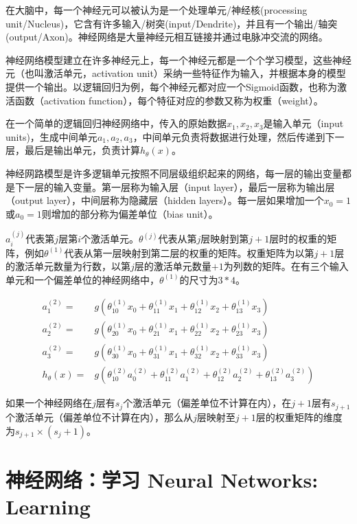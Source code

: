 \documentclass[12pt, a4paper]{article}
\begin{document}
在大脑中，每一个神经元可以被认为是一个处理单元/神经核(processing unit/Nucleus)，它含有许多输入/树突(input/Dendrite)，并且有一个输出/轴突(output/Axon)。神经网络是大量神经元相互链接并通过电脉冲交流的网络。

神经网络模型建立在许多神经元上，每一个神经元都是一个个学习模型，这些神经元（也叫激活单元，activation unit）采纳一些特征作为输入，并根据本身的模型提供一个输出。以逻辑回归为例，每个神经元都对应一个Sigmoid函数，也称为激活函数（activation function），每个特征对应的参数又称为权重（weight）。

在一个简单的逻辑回归神经网络中，传入的原始数据$x_1, x_2, x_3$是输入单元（input units)，生成中间单元$a_1, a_2, a_3$，中间单元负责将数据进行处理，然后传递到下一层，最后是输出单元，负责计算$h_\theta(x)$。

神经网路模型是许多逻辑单元按照不同层级组织起来的网络，每一层的输出变量都是下一层的输入变量。第一层称为输入层（input layer），最后一层称为输出层（output layer），中间层称为隐藏层（hidden layers）。每一层如果增加一个$x_0=1$或$a_0=1$则增加的部分称为偏差单位（bias unit）。

$a_i^{(j)}$代表第$j$层第$i$个激活单元。$\theta^{(j)}$代表从第$j$层映射到第$j+1$层时的权重的矩阵，例如$\theta^{(1)}$代表从第一层映射到第二层的权重的矩阵。权重矩阵为以第$j+1$层的激活单元数量为行数，以第$j$层的激活单元数量$+1$为列数的矩阵。在有三个输入单元和一个偏差单位的神经网络中，$\theta^{(1)}$的尺寸为$3*4$。

\begin{align*}
    a_1^{(2)} =   & g(\theta_{10}^{(1)}x_0+\theta_{11}^{(1)}x_1+\theta_{12}^{(1)}x_2+\theta_{13}^{(1)}x_3)                         \\
    a_2^{(2)} =   & g(\theta_{20}^{(1)}x_0+\theta_{21}^{(1)}x_1+\theta_{22}^{(1)}x_2+\theta_{23}^{(1)}x_3)                         \\
    a_3^{(2)} =   & g(\theta_{30}^{(1)}x_0+\theta_{31}^{(1)}x_1+\theta_{32}^{(1)}x_2+\theta_{33}^{(1)}x_3)                         \\
    h_\theta(x) = & g(\theta_{10}^{(2)}a_0^{(2)}+\theta_{11}^{(2)}a_1^{(2)}+\theta_{12}^{(2)}a_2^{(2)}+\theta_{13}^{(2)}a_3^{(2)})
\end{align*}

如果一个神经网络在$j$层有$s_j$个激活单元（偏差单位不计算在内），在$j+1$层有$s_{j+1}$个激活单元（偏差单位不计算在内），那么从$j$层映射至$j+1$层的权重矩阵的维度为$s_{j+1}\times(s_j+1)$。

\section{神经网络：学习 Neural Networks: Learning}
\end{document}

